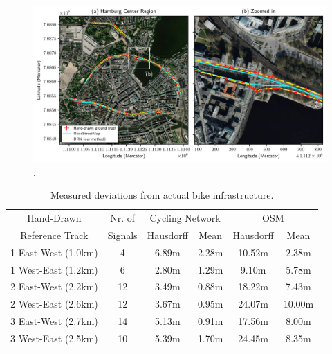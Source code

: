 \begin{figure}[htbp]
\centering 
\includegraphics[width=\linewidth]{images/routing-hand-drawn-ground-truth.pdf}
\caption{.}
\label{fig:}
\end{figure}

\begin{table}[htbp]
\centering
\begin{tabular}{cccccc}
\hline
Hand-Drawn & Nr. of &\multicolumn{2}{c}{Cycling Network} & \multicolumn{2}{c}{OSM} \\
Reference Track & Signals & Hausdorff & Mean & Hausdorff & Mean \\ \hline
1 East-West ({1.0}{km}) & 4 & {6.89}{m} & {2.28}{m} & {10.52}{m} & {2.38}{m} \\
1 West-East ({1.2}{km}) & 6 &{2.80}{m} & {1.29}{m} & {9.10}{m} & {5.78}{m} \\
2 East-West ({2.2}{km}) & 12 & {3.49}{m} & {0.88}{m} & {18.22}{m} & {7.43}{m} \\
2 West-East ({2.6}{km}) & 12 & {3.67}{m} & {0.95}{m} & {24.07}{m}  & {10.00}{m} \\
3 East-West ({2.7}{km}) & 14 & {5.13}{m} & {0.91}{m} & {17.56}{m} & {8.00}{m} \\
3 West-East ({2.5}{km}) & 10 & {5.39}{m} & {1.70}{m} & {24.45}{m} & {8.35}{m} \\ \hline
\end{tabular}
\caption{Measured deviations from actual bike infrastructure.}%
\label{tab:accuracy-comparison}%
\end{table}

